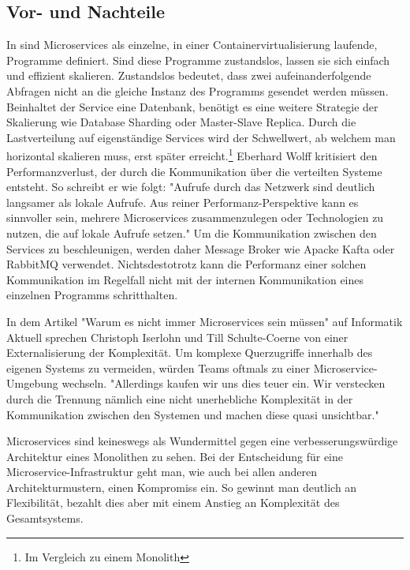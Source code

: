 \subsection{Vor- und Nachteile}
\label{subsec:vorundnachteile}
In  sind Microservices
als einzelne, in einer Containervirtualisierung laufende, Programme definiert. Sind diese Programme
zustandslos, lassen sie sich einfach und effizient skalieren. Zustandslos bedeutet, dass zwei
aufeinanderfolgende Abfragen nicht an die gleiche Instanz des Programms gesendet werden müssen.
Beinhaltet der Service eine Datenbank, benötigt es eine weitere Strategie der Skalierung
wie Database Sharding oder Master-Slave Replica. Durch die Lastverteilung auf eigenständige Services
wird der Schwellwert, ab welchem man horizontal skalieren muss, erst später erreicht.\footnote{Im Vergleich zu einem Monolith}
Eberhard Wolff kritisiert den Performanzverlust, der durch die
Kommunikation über die verteilten Systeme entsteht. So schreibt er wie folgt: "Aufrufe durch das Netzwerk
sind deutlich langsamer als lokale Aufrufe. Aus reiner Performanz-Perspektive kann es sinnvoller sein,
mehrere Microservices zusammenzulegen oder Technologien zu nutzen, die auf lokale Aufrufe setzen."\cite[S. 65, 3. Absatz]{MicroservicesBook}
Um die Kommunikation zwischen den Services zu beschleunigen, werden daher Message Broker wie
Apacke Kafta oder RabbitMQ verwendet. Nichtsdestotrotz kann die Performanz einer solchen
Kommunikation im Regelfall nicht mit der internen Kommunikation eines einzelnen Programms schritthalten.

In dem Artikel "Warum es nicht immer Microservices sein müssen" auf Informatik Aktuell
sprechen Christoph Iserlohn und Till Schulte-Coerne von einer Externalisierung der Komplexität.
Um komplexe Querzugriffe innerhalb des eigenen Systems zu vermeiden, würden Teams oftmals 
zu einer Microservice-Umgebung wechseln. "Allerdings kaufen wir uns dies teuer ein.
Wir verstecken durch die Trennung nämlich eine nicht unerhebliche Komplexität in
der Kommunikation zwischen den Systemen und machen diese quasi unsichtbar."\cite[Paragraph 11]{InformatikAktuellWarumNichtImmerMicroservices}

Microservices sind keineswegs als Wundermittel gegen eine verbesserungswürdige Architektur eines
Monolithen zu sehen. Bei der Entscheidung für eine Microservice-Infrastruktur geht man, wie
auch bei allen anderen Architekturmustern, einen Kompromiss ein. So gewinnt man deutlich
an Flexibilität, bezahlt dies aber mit einem Anstieg an Komplexität des Gesamtsystems.

